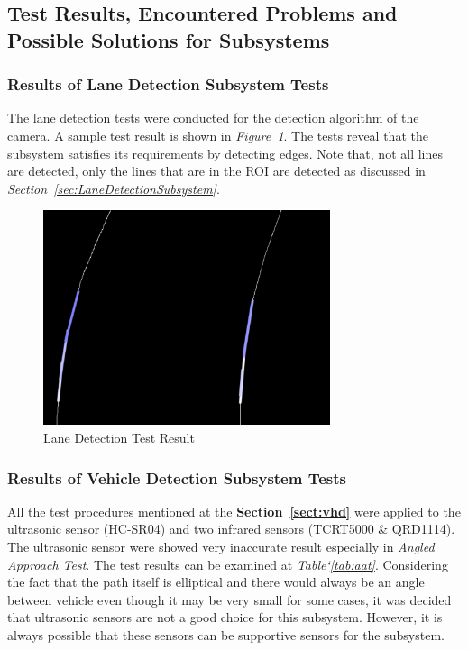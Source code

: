 \documentclass[a4paper,12pt]{article}
\begin{document}
	\subsection{Test Results, Encountered Problems and Possible Solutions for Subsystems}	
	
	\subsubsection*{Results of Lane Detection Subsystem Tests}
		
	The lane detection tests were conducted for the detection algorithm of the camera. A sample test result is shown in \textit{Figure~\ref{fig:laneD_test}}. The tests reveal that the subsystem satisfies its requirements by detecting edges. Note that, not all lines are detected, only the lines that are in the ROI are detected as discussed in \textit{Section~\ref{sec:LaneDetectionSubsystem}}.
	
				\begin{figure}[h]
		\includegraphics[width=0.75\textwidth,center]{images/laneD_test}
		\caption{Lane Detection Test Result \label{fig:laneD_test} }
	\end{figure}
		
	
	
	\subsubsection*{Results of Vehicle Detection Subsystem Tests}
	
		All the test procedures mentioned at the \textbf{Section~\ref{sect:vhd}} were applied to the ultrasonic sensor (HC-SR04) and two infrared sensors (TCRT5000 \& QRD1114). The ultrasonic sensor were showed very inaccurate result especially in \textit{Angled Approach Test}. The test results can be examined at \textit{Table`\ref{tab:aat}}. Considering the fact that the path itself is elliptical and there would always be an angle between vehicle even though it may be very small for some cases, it was decided that ultrasonic sensors are not a good choice for this subsystem. However, it is always possible that these sensors can be supportive sensors for the subsystem.
		
\end{document}
